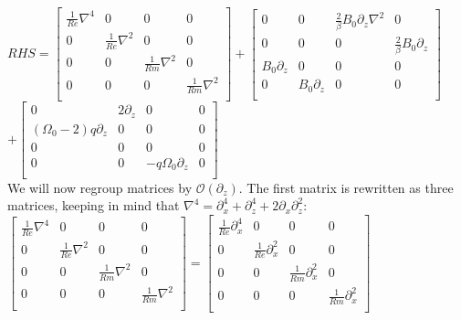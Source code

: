 \documentclass[letterpaper,12pt]{article}
\newcommand\reye{\mathrel{Re}}
\newcommand\reym{\mathrel{Rm}}
\begin{document}
$RHS = \left[\begin{matrix}
\frac{1}{\reye} \nabla^4 & 0 & 0 & 0 \\
0 & \frac{1}{\reye}\nabla^2 & 0 & 0 \\
0 & 0 & \frac{1}{\reym}\nabla^2 & 0 \\
0 & 0 & 0 & \frac{1}{\reym}\nabla^2 \\ 
\end{matrix}\right] + \left[\begin{matrix}
0 & 0 & \frac{2}{\beta}B_0 \partial_z \nabla^2 & 0 \\
0 & 0 & 0 & \frac{2}{\beta} B_0 \partial_z \\
B_0 \partial_z & 0 & 0 & 0 \\
0 & B_0 \partial_z & 0 & 0 \\ \end{matrix}\right]$ \\

$+ \left[\begin{matrix}
0 & 2\partial_z & 0 & 0 \\
\left(\Omega_0 - 2\right)q\partial_z & 0 & 0 & 0 \\
0 & 0 & 0 & 0 \\
0 & 0 & -q\Omega_0\partial_z & 0 \\ \end{matrix}\right]$ \\

We will now regroup matrices by $\mathcal{O}(\partial_z)$. The first matrix is rewritten as three matrices, keeping in mind that $\nabla^4 = \partial_x^4 + \partial_z^4 + 2\partial_x\partial_z^2$: \\

$\left[\begin{matrix}
\frac{1}{\reye} \nabla^4 & 0 & 0 & 0 \\
0 & \frac{1}{\reye}\nabla^2 & 0 & 0 \\
0 & 0 & \frac{1}{\reym}\nabla^2 & 0 \\
0 & 0 & 0 & \frac{1}{\reym}\nabla^2 \\ 
\end{matrix}\right] = \left[\begin{matrix}
\frac{1}{\reye}\partial_x^4 & 0 & 0 & 0 \\
0 & \frac{1}{\reye}\partial_x^2 & 0 &0 \\
0 & 0 & \frac{1}{\reym}\partial_x^2 & 0 \\
0 & 0 & 0 & \frac{1}{\reym}\partial_x^2 \\ \end{matrix}\right] $ \\
\end{document}
